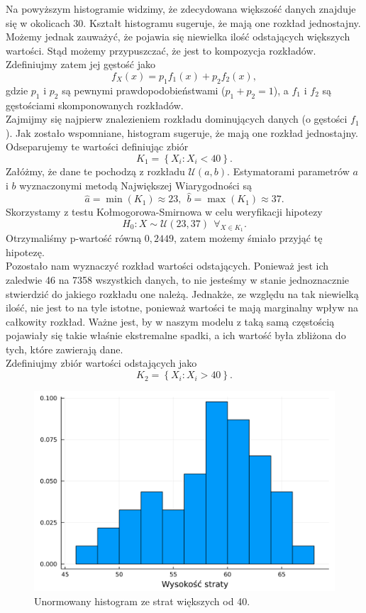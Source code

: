 \documentclass[12pt]{mwart}
\begin{document}
	\noindent Na powyższym histogramie widzimy, że zdecydowana większość danych znajduje się w okolicach 30. Kształt histogramu sugeruje, że mają one rozkład jednostajny. Możemy jednak zauważyć, że pojawia się niewielka ilość odstających większych wartości. Stąd możemy przypuszczać, że jest to kompozycja rozkładów. Zdefiniujmy zatem jej gęstość jako
	\begin{equation}\label{gęstość_strat}
		f_X(x) = p_1 f_1(x) + p_2 f_2(x),
	\end{equation}
	gdzie $p_1$ i $p_2$ są pewnymi prawdopodobieństwami ($p_1 + p_2 = 1$), a $f_1$ i $f_2$ są gęstościami skomponowanych rozkładów.
	\vspace{1.5mm}\\
	Zajmijmy się najpierw znalezieniem rozkładu dominujących danych (o gęstości $f_1$). Jak zostało wspomniane, histogram sugeruje, że mają one rozkład jednostajny. Odseparujemy te wartości definiując zbiór
	$$ K_1 = \left\{ X_i: X_i < 40 \right\}. $$
	Załóżmy, że dane te pochodzą z rozkładu $\mathcal{U}(a, b)$. Estymatorami parametrów $a$ i $b$ wyznaczonymi metodą Największej Wiarygodności są
	$$ \widehat{a} = \min(K_1) \approx 23, \ \ \widehat{b} = \max(K_1) \approx 37. $$
	Skorzystamy z testu Kołmogorowa-Smirnowa w celu weryfikacji hipotezy
	$$ H_0: X \sim \mathcal{U}(23, 37) \ \ \forall_{X \in K_1}. $$
	Otrzymaliśmy p-wartość równą $0,2449$, zatem możemy śmiało przyjąć tę hipotezę.
	\vspace{1.5mm}\\
	Pozostało nam wyznaczyć rozkład wartości odstających. Ponieważ jest ich zaledwie 46 na 7358 wszystkich danych, to nie jesteśmy w stanie jednoznacznie stwierdzić do jakiego rozkładu one należą. Jednakże, ze względu na tak niewielką ilość, nie jest to na tyle istotne, ponieważ wartości te mają marginalny wpływ na całkowity rozkład. Ważne jest, by w naszym modelu z taką samą częstością pojawiały się takie właśnie ekstremalne spadki, a ich wartość była zbliżona do tych, które zawierają dane.
	\vspace{1.5mm}\\
	Zdefiniujmy zbiór wartości odstających jako
	$$ K_2 = \left\{ X_i: X_i > 40 \right\}. $$
	
	\begin{figure}[H]\label{odstające}
		\centering
		\includegraphics[width=\columnwidth]{fig/straty_2.pdf}
		\caption{Unormowany histogram ze strat większych od 40.}
	\end{figure}
\end{document}
